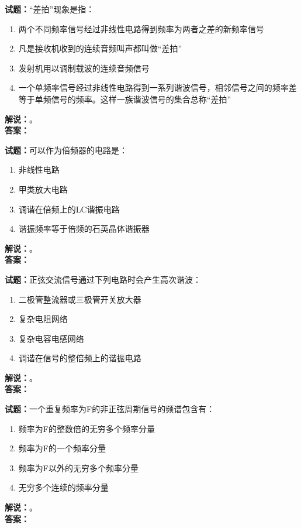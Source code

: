 \documentclass{ctexbook}
\begin{document}
\bigskip




\noindent\textbf{试题：}“差拍”现象是指：
\begin{enumerate}[leftmargin=3em]
\item 两个不同频率信号经过非线性电路得到频率为两者之差的新频率信号
\item 凡是接收机收到的连续音频叫声都叫做“差拍”
\item 发射机用以调制载波的连续音频信号
\item 一个单频率信号经过非线性电路得到一系列谐波信号，相邻信号之间的频率差等于单频信号的频率。这样一族谐波信号的集合总称“差拍”
\end{enumerate}
\noindent\textbf{解说：}\textbf{}。\\\noindent\textbf{答案：}

\bigskip




\noindent\textbf{试题：}可以作为倍频器的电路是：
\begin{enumerate}[leftmargin=3em]
\item 非线性电路
\item 甲类放大电路
\item 调谐在倍频上的LC谐振电路
\item 谐振频率等于倍频的石英晶体谐振器
\end{enumerate}
\noindent\textbf{解说：}\textbf{}。\\\noindent\textbf{答案：}

\bigskip




\noindent\textbf{试题：}正弦交流信号通过下列电路时会产生高次谐波：
\begin{enumerate}[leftmargin=3em]
\item 二极管整流器或三极管开关放大器
\item 复杂电阻网络
\item 复杂电容电感网络
\item 调谐在信号的整倍频上的谐振电路
\end{enumerate}
\noindent\textbf{解说：}\textbf{}。\\\noindent\textbf{答案：}

\bigskip




\noindent\textbf{试题：}一个重复频率为F的非正弦周期信号的频谱包含有：
\begin{enumerate}[leftmargin=3em]
\item 频率为F的整数倍的无穷多个频率分量
\item 频率为F的一个频率分量
\item 频率为F以外的无穷多个频率分量
\item 无穷多个连续的频率分量
\end{enumerate}
\noindent\textbf{解说：}\textbf{}。\\\noindent\textbf{答案：}
\end{document}
